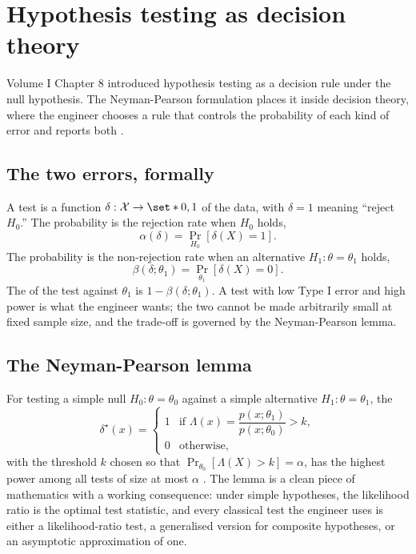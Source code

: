 \section{Hypothesis testing as decision theory}

Volume I Chapter 8 introduced hypothesis testing as a decision rule
under the null hypothesis. The Neyman-Pearson formulation places it
inside decision theory, where the engineer chooses a rule that
controls the probability of each kind of error and reports both
\cite[ch.~10]{text:wasserman2004}.

\subsection{The two errors, formally}

A test is a function $\delta: \mathcal{X} \to \set*{0, 1}$ of the
data, with $\delta = 1$ meaning ``reject $H_{0}$.'' The
 probability is the rejection rate when
$H_{0}$ holds,
\[
\alpha(\delta) = \Pr_{H_{0}}[\delta(X) = 1].
\]
The  probability is the non-rejection rate
when an alternative $H_{1}: \theta = \theta_{1}$ holds,
\[
\beta(\delta; \theta_{1}) = \Pr_{\theta_{1}}[\delta(X) = 0].
\]
The  of the test against $\theta_{1}$ is $1 -
\beta(\delta; \theta_{1})$. A test with low Type I error and high
power is what the engineer wants; the two cannot be made arbitrarily
small at fixed sample size, and the trade-off is governed by the
Neyman-Pearson lemma.



\subsection{The Neyman-Pearson lemma}

For testing a simple null $H_{0}: \theta = \theta_{0}$ against a
simple alternative $H_{1}: \theta = \theta_{1}$, the
\[
\delta^{\star}(x) = \begin{cases}
1 & \text{if } \Lambda(x) = \dfrac{p(x; \theta_{1})}{p(x; \theta_{0})} > k, \\
0 & \text{otherwise,}
\end{cases}
\]
with the threshold $k$ chosen so that $\Pr_{\theta_{0}}[\Lambda(X) >
k] = \alpha$, has the highest power among all tests of size at most
$\alpha$ \cite[ch.~10]{text:wasserman2004}. The lemma is a clean
piece of mathematics with a working consequence: under simple
hypotheses, the likelihood ratio is the optimal test statistic, and
every classical test the engineer uses is either a likelihood-ratio
test, a generalised version for composite hypotheses, or an
asymptotic approximation of one.

